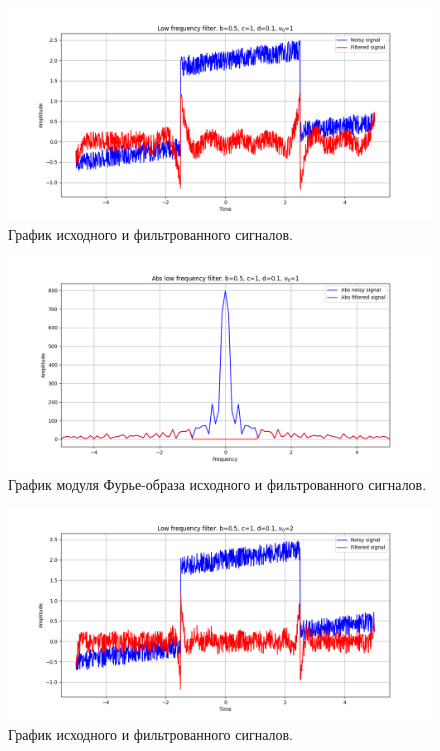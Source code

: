 \documentclass[a4paper, 12pt]{article}
\begin{document}
    \begin{figure}[!htb]
        \centering
        \includegraphics[scale=0.485]{10_u_flt_u_nolow.png}
        \captionsetup{skip=0pt}
        \caption{График исходного и фильтрованного сигналов.}
        \label{fig:fig45}
    \end{figure}
    \begin{figure}[!htb]
        \centering
        \includegraphics[scale=0.485]{10_abs_u_U_nolow.png}
        \captionsetup{skip=0pt}
        \caption{График модуля Фурье-образа исходного и фильтрованного сигналов.}
        \label{fig:fig46}
    \end{figure}
    \begin{figure}[!htb]
        \centering
        \includegraphics[scale=0.485]{11_u_flt_u_nolow.png}
        \captionsetup{skip=0pt}
        \caption{График исходного и фильтрованного сигналов.}
        \label{fig:fig47}
    \end{figure}
\end{document}
